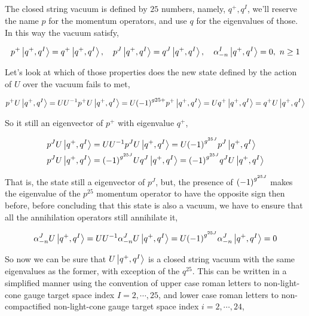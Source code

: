 \subsection{}

The closed string vacuum is defined by $25$ numbers, namely, $q^+,q^I$, we'll reserve the name $p$ for the momentum operators, and use $q$ 
for the eigenvalues of those. In this way the vacuum satisfy,

\begin{align*}
    p^+\ket{q^+,q^I}=q^+\ket{q^+,q^I},\ \ \ p^J\ket{q^+,q^I}=q^J\ket{q^+,q^I},\ \ \ \alpha_{-n}^I\ket{q^+,q^I}=0,\ n\geq 1
\end{align*}

Let's look at which of those properties does the new state defined by the action of $U$ over the vacuum fails to met,

\begin{align*}
    p^+U\ket{q^+,q^I}=UU^{-1}p^+U\ket{q^+,q^I}=U\qty(-1)^{g25+}p^+\ket{q^+,q^I}=Uq^+\ket{q^+,q^I}=q^+U\ket{q^+,q^I}
\end{align*}

So it still an eigenvector of $p^+$ with eigenvalue $q^+$,

\begin{align*}
    p^JU\ket{q^+,q^I}&=UU^{-1}p^JU\ket{q^+,q^I}=U\qty(-1)^{g^{25J}}p^J\ket{q^+,q^I}\\
    p^JU\ket{q^+,q^I}&=\qty(-1)^{g^{25J}}Uq^J\ket{q^+,q^I}=\qty(-1)^{g^{25J}}q^JU\ket{q^+,q^I}
\end{align*}

That is, the state still a eigenvector of $p^J$, but, the presence of $\qty(-1)^{g^{25J}}$ makes the eigenvalue of the $p^{25}$ momentum operator to 
have the opposite sign then before, before concluding that this state is also a vacuum, we have to ensure that all the annihilation operators 
still annihilate it,

\begin{align*}
    \alpha_{-n}^JU\ket{q^+,q^I}=UU^{-1}\alpha_{-n}^JU\ket{q^+,q^I}=U\qty(-1)^{g^{25J}}\alpha_{-n}^J\ket{q^+,q^I}=0
\end{align*}

So now we can be sure that $U\ket{q^+,q^I}$ is a closed string vacuum with the same eigenvalues as the former, with exception of the $q^{25}$. This 
can be written in a simplified manner using the convention of upper case roman letters to non-light-cone gauge target space index $I=2,\cdots,25$, 
and lower case roman letters to non-compactified non-light-cone gauge target space index $i=2,\cdots,24$,

